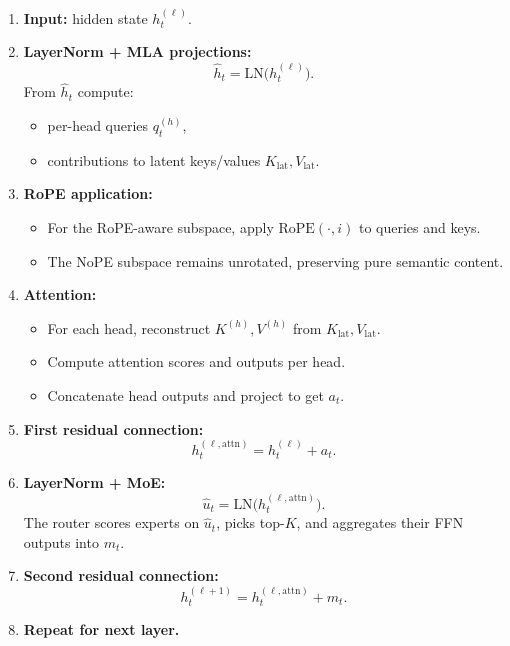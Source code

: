 \documentclass[11pt]{article}
\theoremstyle{remark}
\begin{document}
\begin{enumerate}[label=\arabic*)]
  \item \textbf{Input:} hidden state $h_t^{(\ell)}$.

  \item \textbf{LayerNorm + MLA projections:}
  \[
  \hat{h}_t = \text{LN}\!\big(h_t^{(\ell)}\big).
  \]
  From $\hat{h}_t$ compute:
  \begin{itemize}
    \item per-head queries $q_t^{(h)}$,
    \item contributions to latent keys/values $K_{\text{lat}}, V_{\text{lat}}$.
  \end{itemize}

  \item \textbf{RoPE application:}
  \begin{itemize}
    \item For the RoPE-aware subspace, apply $\text{RoPE}(\cdot, i)$ to queries and keys.
    \item The NoPE subspace remains unrotated, preserving pure semantic content.
  \end{itemize}

  \item \textbf{Attention:}
  \begin{itemize}
    \item For each head, reconstruct $K^{(h)}, V^{(h)}$ from $K_{\text{lat}}, V_{\text{lat}}$.
    \item Compute attention scores and outputs per head.
    \item Concatenate head outputs and project to get $a_t$.
  \end{itemize}

  \item \textbf{First residual connection:}
  \[
  h_t^{(\ell,\text{attn})} = h_t^{(\ell)} + a_t.
  \]

  \item \textbf{LayerNorm + MoE:}
  \[
  \hat{u}_t = \text{LN}\!\big(h_t^{(\ell,\text{attn})}\big).
  \]
  The router scores experts on $\hat{u}_t$, picks top-$K$, and aggregates their FFN outputs into $m_t$.

  \item \textbf{Second residual connection:}
  \[
  h_t^{(\ell+1)} = h_t^{(\ell,\text{attn})} + m_t.
  \]

  \item \textbf{Repeat for next layer.}
\end{enumerate}
\end{document}
